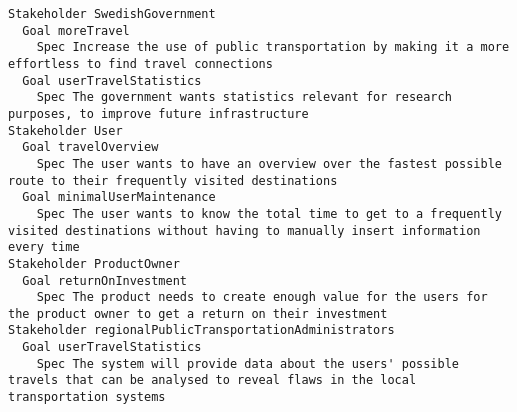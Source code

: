 

\begin{lstlisting}
Stakeholder SwedishGovernment
  Goal moreTravel
    Spec Increase the use of public transportation by making it a more effortless to find travel connections
  Goal userTravelStatistics
    Spec The government wants statistics relevant for research purposes, to improve future infrastructure
Stakeholder User
  Goal travelOverview
    Spec The user wants to have an overview over the fastest possible route to their frequently visited destinations
  Goal minimalUserMaintenance
    Spec The user wants to know the total time to get to a frequently visited destinations without having to manually insert information every time
Stakeholder ProductOwner
  Goal returnOnInvestment
    Spec The product needs to create enough value for the users for the product owner to get a return on their investment
Stakeholder regionalPublicTransportationAdministrators
  Goal userTravelStatistics
    Spec The system will provide data about the users' possible travels that can be analysed to reveal flaws in the local transportation systems

\end{lstlisting}